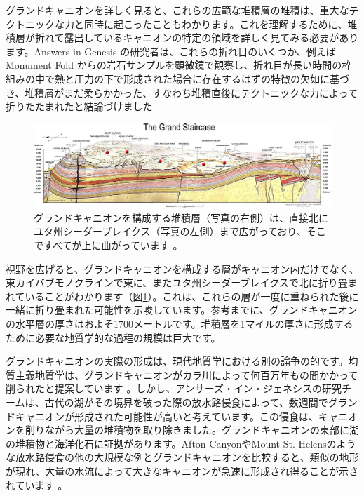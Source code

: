 \documentclass[10pt,twocolumn,letterpaper]{article}
\begin{document}
グランドキャニオンを詳しく見ると、これらの広範な堆積層の堆積は、重大なテクトニックな力と同時に起こったこともわかります。これを理解するために、堆積層が折れて露出しているキャニオンの特定の領域を詳しく見てみる必要があります。Answers in Genesis の研究者は、これらの折れ目のいくつか、例えば Monument Fold からの岩石サンプルを顕微鏡で観察し、折れ目が長い時間の枠組みの中で熱と圧力の下で形成された場合に存在するはずの特徴の欠如に基づき、堆積層がまだ柔らかかった、すなわち堆積直後にテクトニックな力によって折りたたまれたと結論づけました \cite{42}

\begin{figure}
\begin{center}
\includegraphics[width=1\textwidth]{Grand_Staircase-big.jpg}
\end{center}
   \caption{グランドキャニオンを構成する堆積層（写真の右側）は、直接北にユタ州シーダーブレイクス（写真の左側）まで広がっており、そこですべてが上に曲がっています \cite{50}。}
\label{fig:4}
\end{figure}

視野を広げると、グランドキャニオンを構成する層がキャニオン内だけでなく、東カイバブモノクラインで東に、またユタ州シーダーブレイクスで北に折り畳まれていることがわかります（図\ref{fig:4}）。これは、これらの層が一度に重ねられた後に一緒に折り畳まれた可能性を示唆しています。参考までに、グランドキャニオンの水平層の厚さはおよそ1700メートルです。堆積層を1マイルの厚さに形成するために必要な地質学的な過程の規模は巨大です。

グランドキャニオンの実際の形成は、現代地質学における別の論争の的です。均質主義地質学は、グランドキャニオンがカラ川によって何百万年もの間かかって削られたと提案しています \cite{47}。しかし、アンサーズ・イン・ジェネシスの研究チームは、古代の湖がその境界を破った際の放水路侵食によって、数週間でグランドキャニオンが形成された可能性が高いと考えています。この侵食は、キャニオンを削りながら大量の堆積物を取り除きました。グランドキャニオンの東部に湖の堆積物と海洋化石に証拠があります。Afton CanyonやMount St. Helensのような放水路侵食の他の大規模な例とグランドキャニオンを比較すると、類似の地形が現れ、大量の水流によって大きなキャニオンが急速に形成され得ることが示されています \cite{48}。
\end{document}
